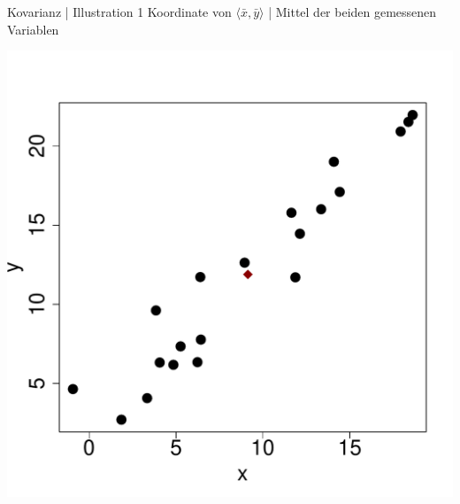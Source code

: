 \begin{frame}
  {Kovarianz | Illustration 1}
  Koordinate von $\langle\bar{x},\bar{y}\rangle$ | Mittel der beiden gemessenen Variablen\\
  \begin{center}
    \includegraphics[height=0.7\textheight]{graphics/cov02}
  \end{center}
\end{frame}


